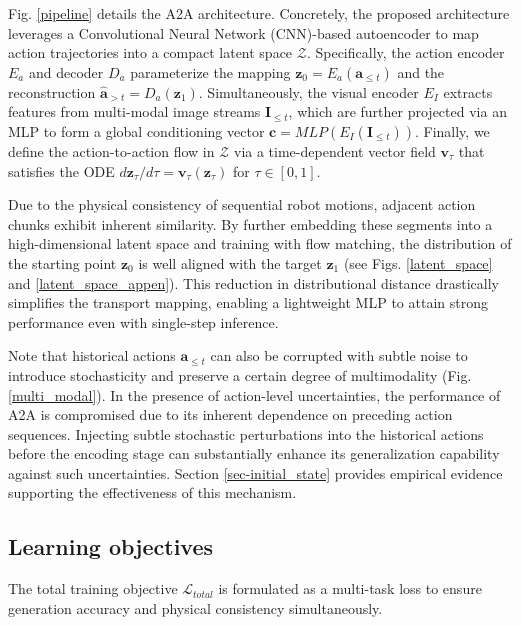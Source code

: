 \documentclass[onecolumn]{fairmeta}
\newcommand{\m}[1]{{A2A}}
\begin{document}
	Fig. \ref{pipeline} details the \m{} architecture. Concretely, the proposed architecture leverages a Convolutional Neural Network (CNN)-based autoencoder to map action trajectories into a compact latent space $\mathcal{Z}$. Specifically, the action encoder $E_a$ and decoder $D_a$ parameterize the mapping $\mathbf{z}_0 = E_a(\mathbf{a}_{\leq t})$ and the reconstruction $\hat{\mathbf{a}}_{>t} = D_a(\mathbf{z}_1)$. Simultaneously, the visual encoder $E_I$ extracts features from multi-modal image streams $\mathbf{I}_{\leq t}$, which are further projected via an MLP to form a global conditioning vector $\mathbf{c} = {MLP}(E_I(\mathbf{I}_{\leq t}))$. Finally, we define the action-to-action flow in $\mathcal{Z}$ via a time-dependent vector field $\mathbf{v}_\tau$ that satisfies the ODE ${d\mathbf{z}_\tau}/{d\tau} = \mathbf{v}_\tau(\mathbf{z}_\tau)$ for $\tau \in [0, 1]$.
	
	Due to the physical consistency of sequential robot motions, adjacent action chunks exhibit inherent similarity. By further embedding these segments into a high-dimensional latent space and training with flow matching, the distribution of the starting point $\mathbf{z}_0$ is well aligned with the target $\mathbf{z}_1$ (see Figs. \ref{latent_space} and \ref{latent_space_appen}). This reduction in distributional distance drastically simplifies the transport mapping, enabling a lightweight MLP to attain strong performance even with single-step inference.
	
	Note that historical actions $\mathbf{a}_{\leq t}$ can also be corrupted with subtle noise to introduce stochasticity and preserve a certain degree of multimodality (Fig. \ref{multi_modal}). In the presence of action-level uncertainties, the performance of \m{} is compromised due to its inherent dependence on preceding action sequences. Injecting subtle stochastic perturbations into the historical actions before the encoding stage can substantially enhance its generalization capability against such uncertainties. Section \ref{sec-initial_state} provides empirical evidence supporting the effectiveness of this mechanism.
	
	
	\subsection{Learning objectives}
	
	The total training objective $\mathcal{L}_{total}$ is formulated as a multi-task loss to ensure generation accuracy and physical consistency simultaneously.
	
\end{document}
